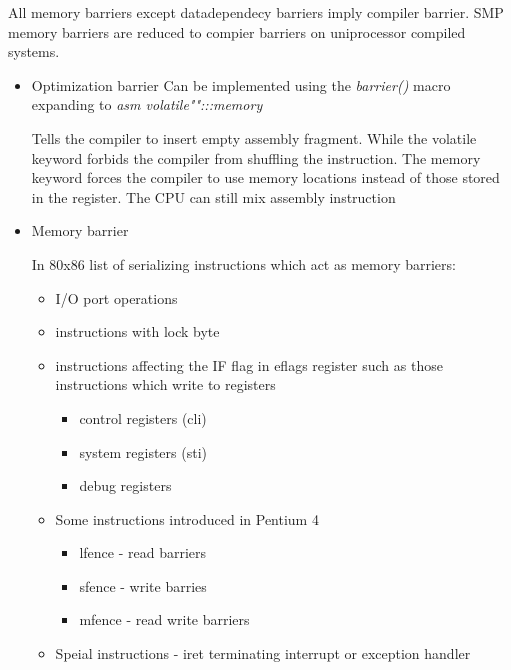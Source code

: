 \documentclass{article}
\begin{document}
All memory barriers except datadependecy barriers imply compiler
barrier. SMP memory barriers are reduced to compier barriers on
uniprocessor compiled systems. 


\begin{itemize}

\item{Optimization barrier} Can be implemented using the
  \emph{barrier()} macro expanding to \emph{asm volatile"":::memory}

  Tells the compiler to insert empty assembly fragment. While the
  volatile keyword forbids the compiler from shuffling the
  instruction.  The memory keyword forces the compiler to use memory
  locations instead of those stored in the register. The CPU can still
  mix assembly instruction


  
  
\item{Memory barrier}

  In 80x86 list of serializing instructions which act as memory
  barriers:


  \begin{itemize}
    \item I/O port operations
    \item instructions with lock byte
    \item instructions affecting the IF flag in eflags register such as those instructions which write to registers
      \begin{itemize}
        \item control registers (cli)
        \item system  registers (sti)
        \item debug   registers          
      \end {itemize}
    \item Some instructions introduced in Pentium 4
      \begin{itemize}
        \item lfence - read barriers
        \item sfence - write barries
        \item mfence - read write barriers
      \end{itemize}
    \item Speial instructions - iret terminating interrupt or exception handler                  
  \end{itemize}
  
\end{itemize}
\end{document}
